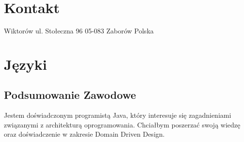 \documentclass[]{friggeri-cv} %
\begin{document}
	
	\begin{aside}
		\section{Kontakt}
		Wiktorów
		ul. Stołeczna 96
		05-083 Zaborów
		Polska
		~
		~
		
		\section{Języki}
	\end{aside}
	
	\begin{absolutelynopagebreak}
		\section{Podsumowanie Zawodowe}
		Jestem doświadczonym programistą Java, który interesuje się zagadnieniami związanymi z architekturą oprogramowania. Chciałbym poszerzać swoją wiedzę oraz doświadczenie w zakresie Domain Driven Design.
	\end{absolutelynopagebreak}
	
\end{document}
